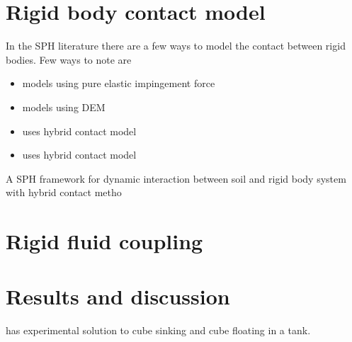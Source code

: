 \documentclass[preprint,12pt]{elsarticle}
\begin{document}
\section{Rigid body contact model}
\label{sec:rbd-contact-model}

In the SPH literature there are a few ways to model the contact
between rigid bodies. Few ways to note are

\begin{itemize}
\item \citet{albano2016modelling} models using pure elastic impingement force
\item \citet{choidevelopment} models using DEM
\item \citet{zhan2020sph} uses hybrid contact model
\item \citet{} uses hybrid contact model
\end{itemize}
A  SPH  framework  for  dynamic interaction  between  soil  and  rigid  body  system  with  hybrid contact   metho


\section{Rigid fluid coupling}
\label{sec:rf-coupling}




\section{Results and discussion}
\label{sec:results}
\citet{wu2014two} has experimental solution to cube sinking and cube floating
in a tank.
\end{document}
